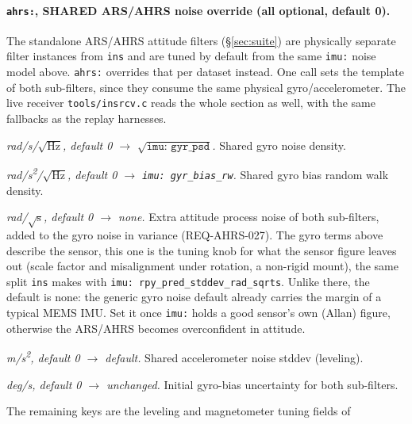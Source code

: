 \documentclass[11pt,a4paper]{article}
\newcommand{\code}[1]{\texttt{#1}}
\begin{document}
\paragraph{\code{ahrs:}, SHARED ARS/AHRS noise override (all optional, default 0).}
The standalone ARS/AHRS attitude filters (\S\ref{sec:suite}) are
physically separate filter instances from \code{ins} and are tuned by default from
the same \code{imu:} noise model above. \code{ahrs:} overrides that per
dataset instead. One call sets the template of both sub-filters, since they
consume the same physical gyro/accelerometer. The live receiver
\code{tools/insrcv.c} reads the whole section as well, with the same
fallbacks as the replay harnesses.
\begin{description}\setlength\itemsep{0pt}
  \item[\code{gyr\_\allowbreak{}noise\_\allowbreak{}psd}] \emph{rad/s/$\sqrt{\text{Hz}}$,
    default 0 $\to$ $\sqrt{\code{imu: gyr\_psd}}$.} Shared gyro noise density.
  \item[\code{gyr\_\allowbreak{}bias\_\allowbreak{}rw}] \emph{rad/s\textsuperscript{2}/$\sqrt{\text{Hz}}$,
    default 0 $\to$ \code{imu: gyr\_bias\_rw}.} Shared gyro bias random walk density.
  \item[\code{rpy\_\allowbreak{}pred\_\allowbreak{}stddev\_\allowbreak{}rad\_\allowbreak{}sqrts}] \emph{rad/$\sqrt{\text{s}}$,
    default 0 $\to$ none.} Extra attitude process noise of both
    sub-filters, added to the gyro noise in variance (REQ-AHRS-027). The
    gyro terms above describe the sensor, this one is the tuning knob for
    what the sensor figure leaves out (scale factor and misalignment under
    rotation, a non-rigid mount), the same split \code{ins} makes with
    \code{imu: rpy\_pred\_stddev\_rad\_sqrts}. Unlike there, the default is
    none: the generic gyro noise default already carries the margin of a
    typical MEMS IMU. Set it once \code{imu:} holds a good sensor's own
    (Allan) figure, otherwise the ARS/AHRS becomes overconfident in
    attitude.
  \item[\code{acc\_\allowbreak{}noise\_\allowbreak{}mps2}] \emph{m/s\textsuperscript{2}, default 0 $\to$
    default.} Shared accelerometer noise stddev (leveling).
  \item[\code{gyr\_\allowbreak{}bias\_\allowbreak{}init\_\allowbreak{}stddev\_\allowbreak{}rps\_\allowbreak{}deg}] \emph{deg/s, default 0 $\to$
    unchanged.} Initial gyro-bias uncertainty for both sub-filters.
\end{description}
The remaining keys are the leveling and magnetometer tuning fields of
\end{document}
